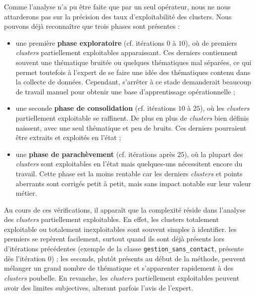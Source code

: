			Comme l'analyse n'a pu être faite que par un seul opérateur, nous ne nous attarderons pas sur la précision des taux d'exploitabilité des clusters.
			Nous pouvons déjà reconnaître que trois phases sont présentes :
			\begin{itemize}
				\item une première \textbf{phase exploratoire} (cf. itérations $0$ à $10$), où de premiers \textit{clusters} partiellement exploitables apparaissant.
				Ces derniers contiennent souvent une thématique bruitée ou quelques thématiques mal séparées, ce qui permet toutefois à l'expert de se faire une idée des thématiques contenu dans la collecte de données.
				Cependant, s'arrêter à ce stade demanderait beaucoup de travail manuel pour obtenir une base d'apprentissage opérationnelle ;
				\item une seconde \textbf{phase de consolidation} (cf. itérations $10$ à $25$), où les \textit{clusters} partiellement exploitable se raffinent.
				De plus en plus de \textit{clusters} bien définis naissent, avec une seul thématique et peu de bruits.
				Ces derniers pourraient être extraits et exploités en l'état ;
				\item une \textbf{phase de parachèvement} (cf. itérations après $25$), où la plupart des \textit{clusters} sont exploitables en l'état mais quelques-uns nécessitent encore du travail.
				Cette phase est la moins rentable car les derniers \textit{clusters} et points aberrants sont corrigés petit à petit, mais sans impact notable sur leur valeur métier. 
			\end{itemize}
			
			Au cours de ces vérifications, il apparaît que la complexité réside dans l'analyse des \textit{clusters} partiellement exploitables.
			En effet, les clusters totalement exploitable ou totalement inexploitables sont souvent simples à identifier.
			les premiers se repèrent facilement, surtout quand ils sont déjà présents lors d'itérations précédentes (exemple de la classe \texttt{gestion\_sans\_contact}, présente dès l'itération $0$) ;
			les seconds, plutôt présents au début de la méthode, peuvent mélanger un grand nombre de thématique et s'apparenter rapidement à des \textit{clusters} poubelle.
			En revanche, les \textit{clusters} partiellement exploitables peuvent avoir des limites subjectives, alterant parfois l'avis de l'expert.
			
